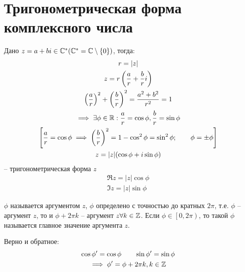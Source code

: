\documentclass[main]{subfiles}
\begin{document}
\chapter{Тригонометрическая форма комплексного числа}

Дано $z = a + bi \in \mathbb{C}^* (\mathbb{C}^* = \mathbb{C} \setminus \{0\})$, тогда:
\begin{gather*}
    r = |z|\\
    z = r \left(\frac{a}{r}+\frac{b}{r}i\right)\\
    \left(\frac{a}{r}\right)^2 +  \left(\frac{b}{r}\right)^2 = \frac{a^2+b^2}{r^2}=1\\
    \implies \exists \phi \in \mathbb{R}: \frac{a}{r} = \cos \phi, \frac{b}{r} = \sin \phi\\
    \left[\frac{a}{r} = \cos \phi \implies \left(\frac{b}{r}\right)^2 = 1 - \cos^2 \phi
        = \sin^2 \phi; \qquad \phi = \pm \phi \right]\\
    z = |z| (\cos \phi + i \sin \phi)
\end{gather*}
-- тригонометрическая форма $z$
\begin{gather*}
    \Re z = |z|\cos\phi\\
    \Im z = |z|\sin\phi
\end{gather*}

$\phi$ называется аргументом $z$, $\phi$ определено с точностью до кратных $2\pi$,
т.е. $\phi$ -- аргумент $z$, то и $\phi+2\pi k$ -- аргумент $z \forall k \in \mathbb{Z}$.
Если $\phi\in \left[0, 2\pi\right)$, то такой $\phi$ называется главное значение аргумента $z$.
\begin{remark}
    Верно и обратное:
    \begin{gather*}
        \cos \phi' = \cos \phi \qquad \sin \phi' = \sin \phi\\
        \implies \phi' = \phi + 2 \pi k, k \in \mathbb{Z}
    \end{gather*}
\end{remark}
\end{document}
